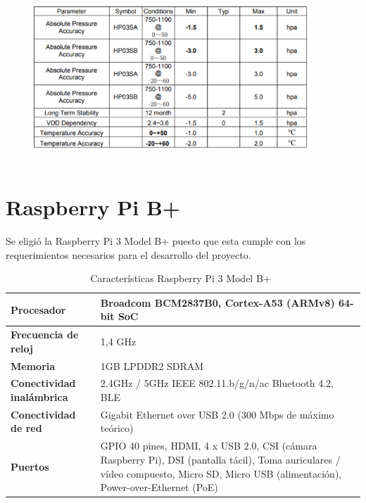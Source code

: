 \begin{figure}[H]
\includegraphics[width=0.93\textwidth]{Figs/tabla_hp03s.PNG} 
\centering
\caption[Características de salida del sensor de presión y temperatura]{ ~\citep{HP03SDatasheet}}
\label{adecuacion}
\end{figure}



\section{Raspberry Pi B+}
Se eligió la Raspberry Pi 3 Model B+ puesto que esta cumple con los requerimientos necesarios para el desarrollo del proyecto.

\begin{table}[h] 
\begin{center}
\begin{tabular}{|p{4cm}|p{10cm}|}\hline
\textbf{Procesador} & Broadcom BCM2837B0, Cortex-A53 (ARMv8) 64-bit SoC\\ \hline
\textbf{Frecuencia de reloj}& 1,4 GHz\\ \hline
\textbf{Memoria}    & 1GB LPDDR2 SDRAM\\ \hline
\textbf{Conectividad inalámbrica} & 2.4GHz / 5GHz IEEE 802.11.b/g/n/ac Bluetooth 4.2, BLE\\ \hline
\textbf{Conectividad de red} & Gigabit Ethernet over USB 2.0 (300 Mbps de máximo teórico)\\ \hline 
\textbf{Puertos}    & GPIO 40 pines, HDMI, 4 x USB 2.0, CSI (cámara Raspberry Pi), DSI (pantalla tácil), Toma auriculares / vídeo compuesto, Micro SD, Micro USB (alimentación), Power-over-Ethernet (PoE)\\ \hline
\end{tabular}
\caption{Características Raspberry Pi 3 Model B+~\citep{Pasor2018}}
\label{tabla2}
\end{center}
\end{table}

